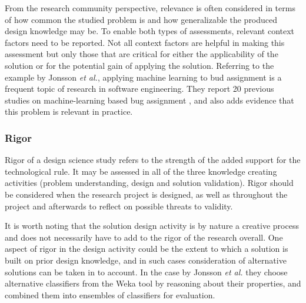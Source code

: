 \documentclass[graybox]{svmult}
\begin{document}
From the research community perspective, relevance is often considered in terms of how common the studied problem is and how generalizable the produced design knowledge may be. To enable both types of assessments, relevant context factors need to be reported. Not all context factors are helpful in making this assessment but only those that are critical for either the applicability of the solution or for the potential gain of applying the solution. 
Referring to the example by Jonsson \emph{et al.}, applying machine learning to bud assignment is  a frequent topic of research in software engineering. They report 20 previous studies on machine-learning based bug assignment \cite[Fig.2]{JonssonBug15}, and also adds evidence that this problem is relevant in practice.

\subsubsection{Rigor %
} 
Rigor of a design science study refers to the strength of the added support for the technological rule. It may be assessed in all of the three knowledge creating activities (problem understanding, design and solution validation). 
Rigor should be considered when the research project is designed, as well as throughout the project and afterwards to reflect on possible threats to validity. 

It is worth noting that the solution design activity is by nature a creative process and does not necessarily have to add to the rigor of the research overall. One aspect of rigor in the design activity could be the extent to which a solution is built on prior design knowledge, and in such cases consideration of alternative solutions can be taken in to account. 
In the case by Jonsson \emph{et al.} they choose alternative classifiers from the Weka tool by reasoning about their properties, and combined them into ensembles of classifiers for evaluation.
\end{document}
